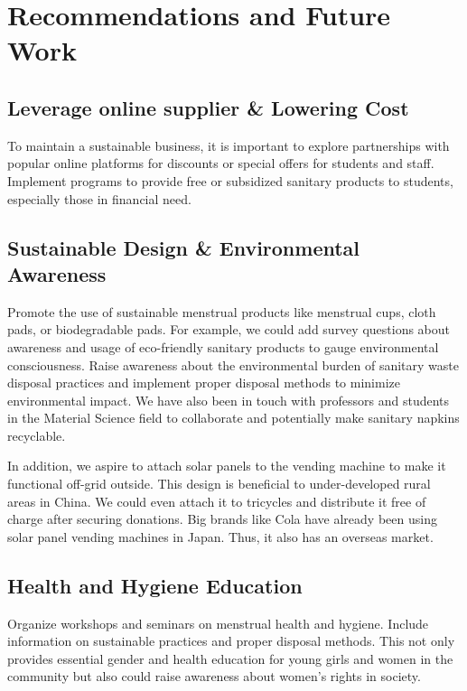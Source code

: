 \section{Recommendations and Future Work}

\subsection{Leverage online supplier \& Lowering Cost}
To maintain a sustainable business, it is important to explore partnerships with popular online platforms for discounts or special offers for students and staff. Implement programs to provide free or subsidized sanitary products to students, especially those in financial need.

\subsection{Sustainable Design \& Environmental Awareness}
Promote the use of sustainable menstrual products like menstrual cups, cloth pads, or biodegradable pads. For example, we could add survey questions about awareness and usage of eco-friendly sanitary products to gauge environmental consciousness. Raise awareness about the environmental burden of sanitary waste disposal practices and implement proper disposal methods to minimize environmental impact. We have also been in touch with professors and students in the Material Science field to collaborate and potentially make sanitary napkins recyclable.

In addition, we aspire to attach solar panels to the vending machine to make it functional off-grid outside. This design is beneficial to under-developed rural areas in China. We could even attach it to tricycles and distribute it free of charge after securing donations. Big brands like Cola have already been using solar panel vending machines in Japan. Thus, it also has an overseas market.

\subsection{Health and Hygiene Education}
Organize workshops and seminars on menstrual health and hygiene. Include information on sustainable practices and proper disposal methods. This not only provides essential gender and health education for young girls and women in the community but also could raise awareness about women’s rights in society.

